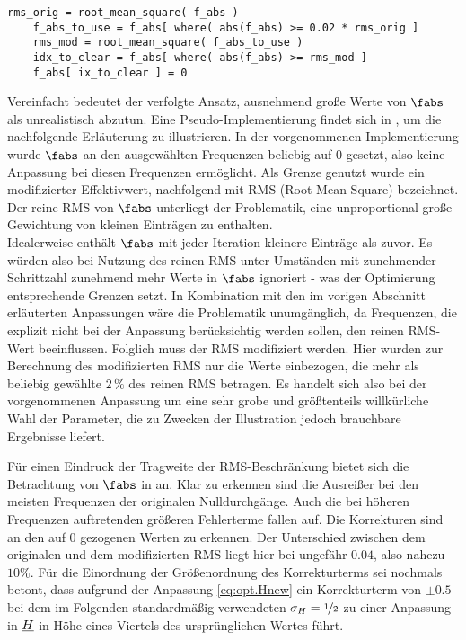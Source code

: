 \documentclass[../Report.tex]{subfiles}
\begin{document}
\lstset{language=Python}
\begin{lstlisting}[caption={Pseudocode zur Veranschaulichung der Anpassung des Korrekturterms}, label=code:opt.H.pseudoRMS, numbers=none]
	rms_orig = root_mean_square( f_abs )
	f_abs_to_use = f_abs[ where( abs(f_abs) >= 0.02 * rms_orig ] 
	rms_mod = root_mean_square( f_abs_to_use )
	idx_to_clear = f_abs[ where( abs(f_abs) >= rms_mod ] 
	f_abs[ ix_to_clear ] = 0
\end{lstlisting}

Vereinfacht bedeutet der verfolgte Ansatz, ausnehmend große Werte von $\fabs$ als unrealistisch abzutun. Eine Pseudo-Implementierung findet sich in , um die nachfolgende Erläuterung zu illustrieren. In der vorgenommenen Implementierung wurde $\fabs$ an den ausgewählten Frequenzen beliebig auf $0$ gesetzt, also keine Anpassung bei diesen Frequenzen ermöglicht.
Als Grenze genutzt wurde ein modifizierter Effektivwert, nachfolgend mit RMS (Root Mean Square) bezeichnet. 
Der reine RMS von $\fabs$ unterliegt der Problematik, eine unproportional große Gewichtung von kleinen Einträgen zu enthalten.
\\
Idealerweise enthält $\fabs$ mit jeder Iteration kleinere Einträge als zuvor. Es würden also bei Nutzung des reinen RMS unter Umständen mit zunehmender Schrittzahl zunehmend mehr Werte in $\fabs$ ignoriert - was der Optimierung entsprechende Grenzen setzt. 
In Kombination mit den im vorigen Abschnitt erläuterten Anpassungen wäre die Problematik unumgänglich, da Frequenzen, die explizit nicht bei der Anpassung berücksichtig werden sollen, den reinen RMS-Wert beeinflussen.
Folglich muss der RMS modifiziert werden. Hier wurden zur Berechnung des modifizierten RMS nur die Werte einbezogen, die mehr als beliebig gewählte $2 \, \%$ des reinen RMS betragen. Es handelt sich also bei der vorgenommenen Anpassung um eine sehr grobe und größtenteils willkürliche Wahl der Parameter, die zu Zwecken der Illustration jedoch brauchbare Ergebnisse liefert.

Für einen Eindruck der Tragweite der RMS-Beschränkung bietet sich die Betrachtung von $\fabs$ in  an. Klar zu erkennen sind die Ausreißer bei den meisten Frequenzen der originalen Nulldurchgänge. Auch die bei höheren Frequenzen auftretenden größeren Fehlerterme fallen auf. Die Korrekturen sind an den auf 0 gezogenen Werten zu erkennen. Der Unterschied zwischen dem originalen und dem modifizierten RMS liegt hier bei ungefähr $0.04$, also nahezu $10 \%$.
Für die Einordnung der Größenordnung des Korrekturterms sei nochmals betont, dass aufgrund der Anpassung \eqref{eq:opt.Hnew} ein Korrekturterm von $\pm 0.5$ bei dem im Folgenden standardmäßig verwendeten $\sigma_H = \nicefrac{1}{2}$ zu einer Anpassung in $\underline{H}$ in Höhe eines Viertels des ursprünglichen Wertes führt.
\end{document}
